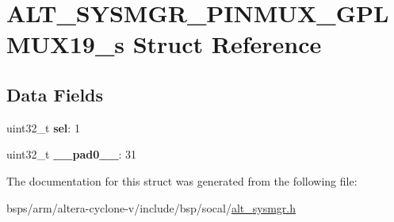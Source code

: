 \hypertarget{structALT__SYSMGR__PINMUX__GPLMUX19__s}{}\section{A\+L\+T\+\_\+\+S\+Y\+S\+M\+G\+R\+\_\+\+P\+I\+N\+M\+U\+X\+\_\+\+G\+P\+L\+M\+U\+X19\+\_\+s Struct Reference}
\label{structALT__SYSMGR__PINMUX__GPLMUX19__s}
\subsection*{Data Fields}
\begin{DoxyCompactItemize}
\item 
\mbox{\label{structALT__SYSMGR__PINMUX__GPLMUX19__s_a3c460e1341439c6537b756add2906126}} 
uint32\+\_\+t {\bfseries sel}\+: 1
\item 
\mbox{\label{structALT__SYSMGR__PINMUX__GPLMUX19__s_a885b66f607356a51c38e06aff1584fdd}} 
uint32\+\_\+t {\bfseries \+\_\+\+\_\+pad0\+\_\+\+\_\+}\+: 31
\end{DoxyCompactItemize}


The documentation for this struct was generated from the following file\+:\begin{DoxyCompactItemize}
\item 
bsps/arm/altera-\/cyclone-\/v/include/bsp/socal/\mbox{\hyperlink{alt__sysmgr_8h}{alt\+\_\+sysmgr.\+h}}\end{DoxyCompactItemize}
